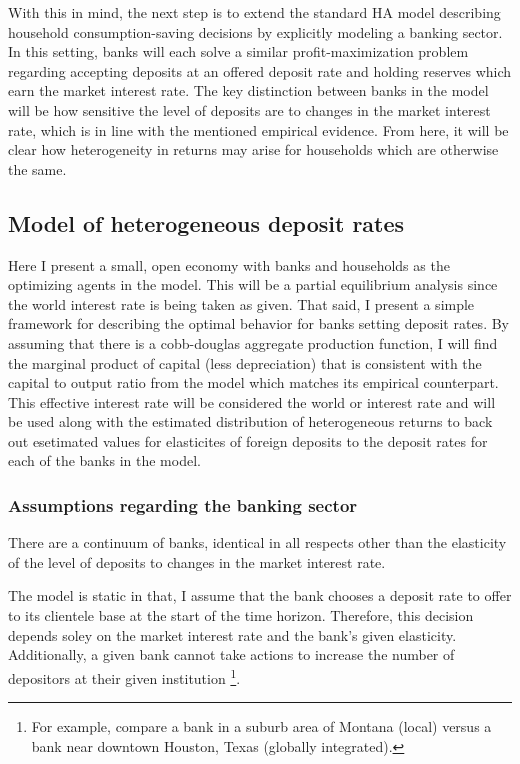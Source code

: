 \par With this in mind, the next step is to extend the standard HA model describing household consumption-saving decisions by explicitly modeling a banking sector. In this setting, banks will each solve a similar profit-maximization problem regarding accepting deposits at an offered deposit rate and holding reserves which earn the market interest rate. The key distinction between banks in the model will be how sensitive the level of deposits are to changes in the market interest rate, which is in line with the mentioned empirical evidence. From here, it will be clear how heterogeneity in returns may arise for households which are otherwise the same.

\subsection{Model of heterogeneous deposit rates}

\par Here I present a small, open economy with banks and households as the optimizing agents in the model. This will be a partial equilibrium analysis since the world interest rate is being taken as given. That said, I present a simple framework for describing the optimal behavior for banks setting deposit rates. By assuming that there is a cobb-douglas aggregate production function, I will find the marginal product of capital (less depreciation) that is consistent with the capital to output ratio from the model which matches its empirical counterpart. This effective interest rate will be considered the world or  interest rate and will be used along with the estimated distribution of heterogeneous returns to back out esetimated values for elasticites of foreign deposits to the deposit rates for each of the banks in the model.  

\subsubsection{Assumptions regarding the banking sector}

\par There are a continuum of banks, identical in all respects other than the elasticity of the level of deposits to changes in the market interest rate.

\par The model is static in that, I assume that the bank chooses a deposit rate to offer to its clientele base at the start of the time horizon. Therefore, this decision depends soley on the market interest rate and the bank's given elasticity. Additionally, a given bank cannot take actions to increase the number of depositors at their given institution \footnote{For example, compare a bank in a suburb area of Montana (local) versus a bank near downtown Houston, Texas (globally integrated).}.

